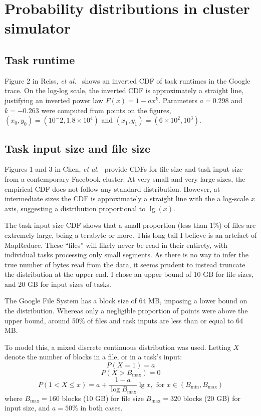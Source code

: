 \section{Probability distributions in cluster simulator} \label{appendix:test-distributions}

\subsection{Task runtime}

Figure 2 in Reiss, \textit{et al.}~\cite{Reiss:2012} shows an inverted CDF of task runtimes in the Google trace. On the log-log scale, the inverted CDF is approximately a straight line, justifying an inverted power law $F(x) = 1 - ax^k$. Parameters $a = 0.298$ and $k=-0.263$ were computed from points on the figures, $\left(x_0,y_0\right) = \left(10^-2,1.8\times 10^4\right)$ and $\left(x_1,y_1\right)=\left(6\times 10^2, 10^3\right)$.

\subsection{Task input size and file size}

Figures 1 and 3 in Chen, \textit{et al.}~\cite{Chen:2012} provide CDFs for file size and task input size from a contemporary Facebook cluster. At very small and very large sizes, the empirical CDF does not follow any standard distribution. However, at intermediate sizes the CDF is approximately a straight line with the a log-scale $x$ axis, suggesting a distribution proportional to $\lg(x)$.

The task input size CDF shows that a small proportion (less than 1\%) of files are extremely large, being a terabyte or more. This long tail I believe is an artefact of MapReduce. These ``files'' will likely never be read in their entirety, with individual tasks processing only small segments. As there is no way to infer the true number of bytes read from the data, it seems prudent to instead truncate the distribution at the upper end. I chose an upper bound of 10 GB for file sizes, and 20 GB for input sizes of tasks.

The Google File System has a block size of 64 MB, imposing a lower bound on the distribution. Whereas only a negligible proportion of points were above the upper bound, around 50\% of files and task inputs are less than or equal to 64 MB. 

To model this, a mixed discrete continuous distribution was used. Letting $X$ denote the number of blocks in a file, or in a task's input:
\[P\left(X=1\right)=a\]
\[P\left(X>B_{\mathrm{max}}\right)=0\]
\[P(1<X\leq x)=a+\frac{1-a}{\log{B_{\mathrm{max}}}}\lg x,\text{ for }x\in\left(B_{\mathrm{min}},B_{\mathrm{max}}\right)\]
where $B_{\mathrm{max}} = 160$ blocks (10 GB) for file size $B_{\mathrm{max}} = 320$ blocks (20 GB) for input size, and $a = 50\%$ in both cases.